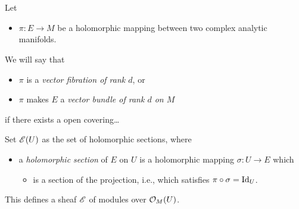 \section{\cite{sabbah2007isomonodromic}} %
\begin{defn}
  Let
  \begin{itemize}
    \item $\pi:E\to M$ be a holomorphic mapping between two complex analytic
      manifolds.
  \end{itemize}
  We will say that
  \begin{itemize}
    \item $\pi$ is a \emph{vector fibration of rank $d$}, or
    \item $\pi$ makes $E$ a \emph{vector bundle of rank $d$ on $M$}
  \end{itemize}
  if there exists a open covering\dots
\end{defn}
Set $\mathscr{E}(U)$ as the set of holomorphic sections, where
\begin{itemize}
  \item a \emph{holomorphic section} of $E$ on $U$ is a holomorphic mapping
    $\sigma:U\to E$ which
    \begin{itemize}
      \item is a section of the projection, i.e., which satisfies
        $\pi\circ\sigma=\operatorname{Id}_U$.
    \end{itemize}
\end{itemize}
This defines a sheaf $\mathscr{E}$ of modules over $\mathcal{O}_M(U)$.
